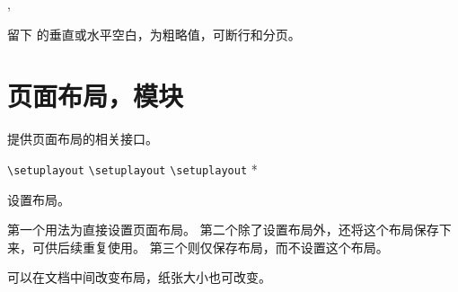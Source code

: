 \documentclass{cusdoc}
\begin{document}
\begin{function}{\breakablevspace,\breakablehspace}
  \begin{syntax}
    \V\breakablevspace {}
  \end{syntax}
留下  的垂直或水平空白，为粗略值，可断行和分页。
\end{function}


\section[float-barrier=on]{页面布局，模块}

 提供页面布局的相关接口。

\begin{function}{\setuplayout}
  \begin{syntax}
    \verb|\setuplayout|                \;
    \verb|\setuplayout|    
    \verb|\setuplayout| *  
  \end{syntax}
设置布局。

第一个用法为直接设置页面布局。
第二个除了设置布局外，还将这个布局保存下来，可供后续重复使用。
第三个则仅保存布局，而不设置这个布局。

可以在文档中间改变布局，纸张大小也可改变。
\end{function}
\end{document}
